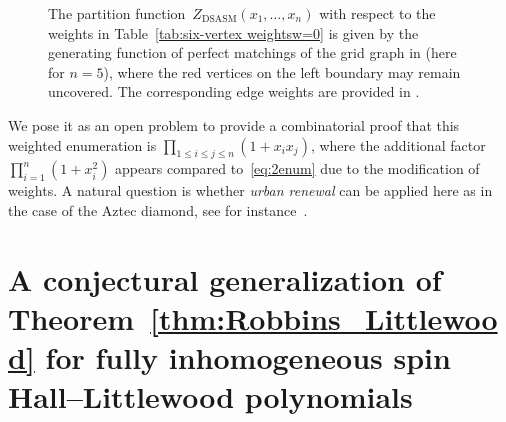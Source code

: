 \documentclass[ALCO, Unicode]{cedram}
\newcommand{\deff}[1]{\emph{#1}}
\DeclareMathOperator{\DSASM}{DSASM}
\begin{document}
\begin{figure}[htbp]
\begin{subfigure}[t]{.45\textwidth}
			\caption{}
			\label{subfig:weights}
		\end{subfigure}
		\caption{The partition function~$Z_{\DSASM}(x_1,\ldots,x_n)$ with respect to the weights in Table~\ref{tab:six-vertex weightsw=0} is given by the generating function of perfect matchings of the grid graph in  (here for $n=5$), where the red vertices on the left boundary may remain uncovered. The corresponding edge weights are provided in .}
		\label{fig:matching}
	\end{figure}
	
	
	We pose it as an open problem to provide a combinatorial proof that this weighted enumeration is $\prod_{1 \le i \le j \le n} (1+x_i x_j)$, where the additional factor $\prod_{i=1}^n (1 + x_i^2)$ appears compared to~\eqref{eq:2enum} due to the modification of weights. A natural question is whether \deff{urban renewal} can be applied here as in the case of the Aztec diamond, see for instance~\cite{Propp23}.
	
	
	\section{A conjectural generalization of Theorem~\ref{thm:Robbins_Littlewood} for fully inhomogeneous spin Hall--Littlewood polynomials}\label{sec:conjecture}
	
\end{document}
